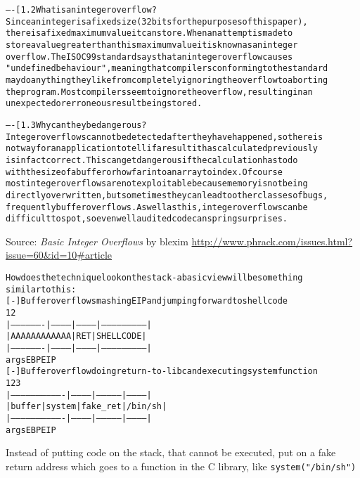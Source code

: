 \documentclass[Screen16to9,17pt]{foils}
\begin{document}
\begin{alltt}\footnotesize
----[ 1.2 What is an integer overflow?
Since an integer is a fixed size (32 bits for the purposes of this paper),
there is a fixed maximum value it can store.  When an attempt is made to
store a value greater than this maximum value it is known as an integer
overflow.  The ISO C99 standard says that an integer overflow causes
"undefined behaviour", meaning that compilers conforming to the standard
may do anything they like from completely ignoring the overflow to aborting
the program.  Most compilers seem to ignore the overflow, resulting in an
unexpected or erroneous result being stored.

----[ 1.3 Why can they be dangerous?
Integer overflows cannot be detected after they have happened, so there is
not way for an application to tell if a result it has calculated previously
is in fact correct.  This can get dangerous if the calculation has to do
with the size of a buffer or how far into an array to index.  Of course
most integer overflows are not exploitable because memory is not being
directly overwritten, but sometimes they can lead to other classes of bugs,
frequently buffer overflows.  As well as this, integer overflows can be
difficult to spot, so even well audited code can spring surprises.
\end{alltt}

Source:
\emph{Basic Integer Overflows} by blexim
\url{http://www.phrack.com/issues.html?issue=60&id=10#article}



\begin{alltt}\footnotesize
  How does the technique look on the stack - a basic view will be something
  similar to this:
  [-] Buffer overflow smashing EIP and jumping forward to shellcode
                                                   1                    2
  |-------------------|-----------|------------|---------------------------|
  |             AAAAAAAAAAAA      |    RET     |        SHELLCODE          |
  |-------------------|-----------|------------|---------------------------|
                     args              EBP        EIP
  [-] Buffer overflow doing return-to-libc and executing system function
                                                    1             2         3
  |-------------------------------|------------|--------------|------------|
  |            buffer             |   system   |   fake_ret   |   /bin/sh  |
  |-------------------------------|------------|--------------|------------|
                     args               EBP        EIP
\end{alltt}
Instead of putting code on the stack, that cannot be executed, put on a fake return address which goes to a function in the C library, like \verb+system("/bin/sh")+
\end{document}
